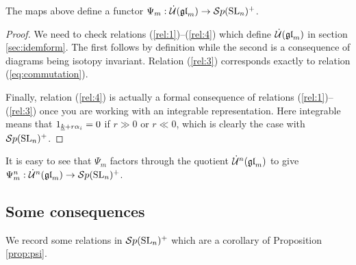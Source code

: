 \documentclass[10pt,leqno]{article}
\begin{document}

\begin{prop}\label{prop:psi}
The maps above define a functor $\Psi_m: \dot{{\mathcal{U}}}({\mathfrak{gl}}_m) \rightarrow {\mathcal{S}p}({\rm{SL}}_n)^+$. 
\end{prop}
\begin{proof}
We need to check relations (\ref{rel:1})--(\ref{rel:4}) which define $\dot{{\mathcal{U}}}({\mathfrak{gl}}_m)$ in section \ref{sec:idemform}. The first follows by definition while the second is a consequence of diagrams being isotopy invariant. Relation (\ref{rel:3}) corresponds exactly to relation (\ref{eq:commutation}). 

Finally, relation (\ref{rel:4}) is actually a formal consequence of relations (\ref{rel:1})--(\ref{rel:3}) once you are working with an integrable representation. Here integrable means that $1_{{\underline{k}}+r\alpha_i} = 0$ if $r \gg 0$ or $r \ll 0$, which is clearly the case with ${\mathcal{S}p}({\rm{SL}}_n)^+$. 
\end{proof}

It is easy to see that $\Psi_m$ factors through the quotient $\dot{{\mathcal{U}}}^n({\mathfrak{gl}}_m)$ to give $\Psi_m^n: \dot{{\mathcal{U}}}^n({\mathfrak{gl}}_m) \rightarrow {\mathcal{S}p}({\rm{SL}}_n)^+$.

\subsection{Some consequences}

We record some relations in ${\mathcal{S}p}({\rm{SL}}_n)^+$ which are a corollary of Proposition \ref{prop:psi}. 
\end{document}
